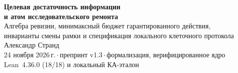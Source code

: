 \documentclass[11pt,a4paper]{article}
\theoremstyle{preprintthm}
\theoremstyle{preprintdef}
\begin{document}
\thispagestyle{plain}
\begin{center}
  {\LARGE\bfseries Целевая достаточность информации\\[3pt]
  и атом исследовательского ремонта}\\[10pt]
  {\large\color{muted} Алгебра ревизии, минимаксный бюджет гарантированного действия,\\
  инварианты смены рамки и спецификация локального клеточного протокола}\\[12pt]
  {\normalsize Александр Странд}\\[4pt]
  {\small\color{muted} 24 ноября 2026\,г.\,$\cdot$\,препринт v1.3\,$\cdot$\,формализация, верифицированное ядро Lean~4.36.0 (18/18) и локальный КА-эталон}
\end{center}

\vspace{4pt}
\end{document}
